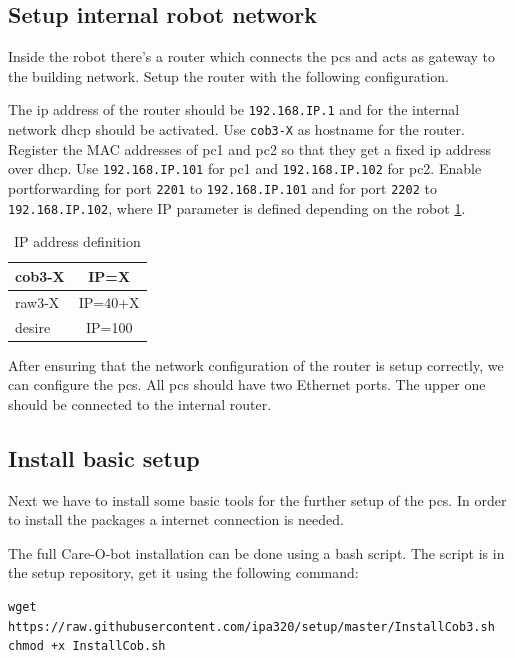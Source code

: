 \subsection{Setup internal robot network}\label{sec:network}
Inside the robot there's a router which connects the pcs and acts as gateway to the building network. Setup the router with the following configuration. 

The ip address of the router should be \texttt{192.168.IP.1} and for the internal network dhcp should be activated. Use \texttt{cob3-X} as hostname for the router. Register the MAC addresses of pc1 and pc2 so that they get a fixed ip address over dhcp. Use \texttt{192.168.IP.101} for pc1 and \texttt{192.168.IP.102} for pc2. Enable portforwarding for port \texttt{2201} to \texttt{192.168.IP.101} and for port \texttt{2202} to \texttt{192.168.IP.102}, where IP parameter is defined depending on the robot \ref{IP_table}.

\begin{table}[h]
\begin{center}
\begin{tabular}{ | l | c | }
  \hline
  cob3-X & IP=X \\
  \hline
  raw3-X & IP=40+X \\
  \hline
  desire & IP=100 \\
  \hline
\end{tabular}
\end{center}
\caption{IP address definition}
\label{IP_table}
\end{table}

After ensuring that the network configuration of the router is setup correctly, we can configure the pcs. All pcs should have two Ethernet ports. The upper one should be connected to the internal router. 

\subsection{Install basic setup}
Next we have to install some basic tools for the further setup of the pcs. In order to install the packages a internet connection is needed.

The full Care-O-bot installation can be done using a bash script. The script is in the setup repository, get it using the following command:

\begin{lstlisting}
wget https://raw.githubusercontent.com/ipa320/setup/master/InstallCob3.sh
chmod +x InstallCob.sh
\end{lstlisting}


